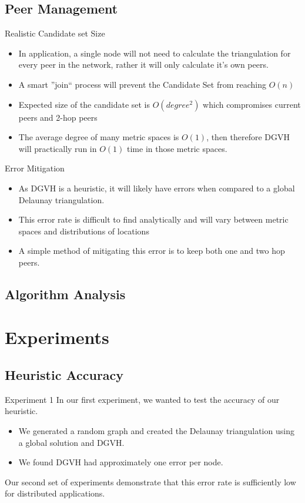 \documentclass[8pt]{beamer}
\begin{document}
\subsection{Peer Management}
	\begin{frame}{Realistic Candidate set Size}
		\begin{itemize}
			\item In application, a single node will not need to calculate the triangulation for every peer in the network, rather it will only calculate it's own peers.
			\item A smart ''join`` process will prevent the Candidate Set from reaching $O(n)$
			\item Expected size of the candidate set is $O(degree^2)$ which compromises current peers and 2-hop peers
			\item The average degree of many metric spaces is $O(1)$, then therefore DGVH will practically run in $O(1)$ time in those metric spaces.
		\end{itemize}
	\end{frame}
	\begin{frame}{Error Mitigation}
		\begin{itemize}
			\item As DGVH is a heuristic, it will likely have errors when compared to a global Delaunay triangulation.
			\item This error rate is difficult to find analytically and will vary between metric spaces and distributions of locations
			\item A simple method of mitigating this error is to keep both one and two hop peers.
		\end{itemize}
	\end{frame}
	
\subsection{Algorithm Analysis}
	
	
\section{Experiments}
	
\subsection{Heuristic Accuracy}

	\begin{frame}{Experiment 1}
		In our first experiment, we wanted to test the accuracy of our heuristic.
		\begin{itemize}
			\item We generated a random graph and created the Delaunay triangulation using a global solution and DGVH.
			\item We found DGVH had approximately one error per node.
		\end{itemize}
		
		Our second set of experiments demonstrate that this error rate is sufficiently low for distributed applications.
	\end{frame}
\end{document}
